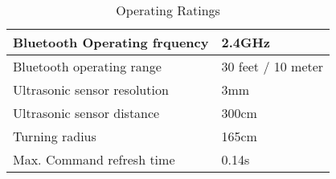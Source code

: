 \documentclass[final]{scrreprt} %
\begin{document}
\begin{table}[h]
\begin{center}
\caption{Operating Ratings}
\label{tab:table}
\begin{tabular}{ | l | l |}
    \hline
    Bluetooth Operating frquency & 2.4GHz \\ \hline
    Bluetooth operating range & 30 feet / 10 meter \\\hline
    Ultrasonic sensor resolution    & 3mm \\\hline
    Ultrasonic sensor distance	         & 300cm \\\hline
    Turning radius & 165cm \\\hline
    Max. Command refresh time & 0.14s\\\hline
\end{tabular}
\end{center}
\end{table}
\end{document}
